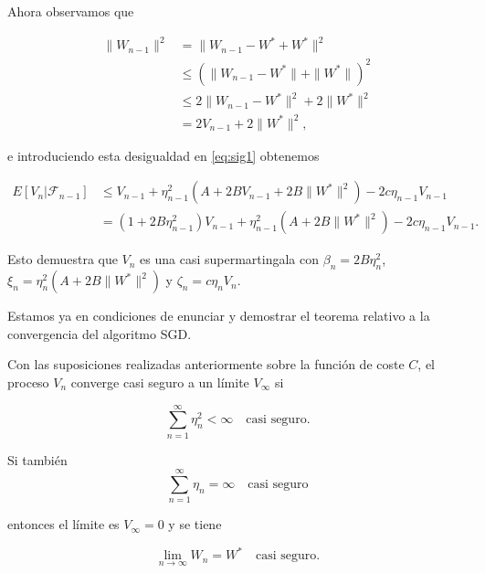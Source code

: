 Ahora observamos que 

\begin{align*}
	\| W_{n-1} \|^2 &= \| W_{n-1} - W^* + W^* \|^2 \\
			     &\leq (\| W_{n-1} - W^* \| + \|W^* \|)^2 \\
			     & \leq 2 \| W_{n-1} - W^* \|^2 + 2 \|W^* \|^2 \\
			     &= 2V_{n-1} + 2 \|W^* \|^2,
\end{align*}

e introduciendo esta desigualdad en \ref{eq:sig1} obtenemos

\begin{align*}
	E[V_n | \mathcal{F}_{n-1} ] &\leq V_{n-1} + \eta^2_{n-1} (A+ 2BV_{n-1} + 2B \|W^* \|^2) - 2c\eta_{n-1} V_{n-1} \\
					&= (1 + 2B \eta_{n-1}^2) V_{n-1} + \eta^2_{n-1} (A + 2B \| W^* \|^2) - 2c \eta_{n-1} V_{n-1}.
\end{align*}

Esto demuestra que $V_n$ es una casi supermartingala con $\beta_n=2B\eta^2_n$, $\xi_n = \eta_n^2(A + 2B \| W^* \|^2)$ y $\zeta_n = c \eta_n V_n$.

Estamos ya en condiciones de enunciar y demostrar el teorema relativo a la convergencia del algoritmo SGD.

\begin{teorema}\label{teor:convsgd}
	Con las suposiciones realizadas anteriormente sobre la función de coste $C$, el proceso $V_n$ converge casi seguro a un límite $V_{\infty}$ si 

	\begin{equation}\label{eq:convsgd1}
		\sum_{n=1}^{\infty} \eta^2_{n} < \infty \quad \text{casi seguro.}
	\end{equation}

	Si también
	\begin{equation}\label{eq:convsgd2}
		\sum_{n=1}^{\infty} \eta_{n} = \infty \quad \text{casi seguro}
	\end{equation}

	entonces el límite es $V_{\infty}=0$ y se tiene

	\begin{equation*}
		\displaystyle \lim_{n \to \infty} W_n = W^* \quad \text{casi seguro.}
	\end{equation*}
\end{teorema}


\vspace{1cm}

